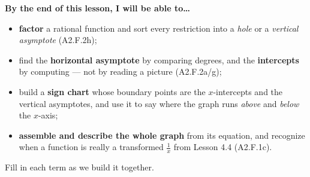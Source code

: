 \documentclass[10pt]{article}
\begin{document}
\namedateperiod

\vspace{0.08in}

\begin{objectivebox}
\textbf{By the end of this lesson, I will be able to\dots}
\begin{itemize}\setlength{\itemsep}{2pt}
  \item \textbf{factor} a rational function and sort every restriction into a \emph{hole} or a \emph{vertical asymptote} (A2.F.2h);
  \item find the \textbf{horizontal asymptote} by comparing degrees, and the \textbf{intercepts} by computing --- not by reading a picture (A2.F.2a/g);
  \item build a \textbf{sign chart} whose boundary points are the $x$-intercepts and the vertical asymptotes, and use it to say where the graph runs \emph{above} and \emph{below} the $x$-axis;
  \item \textbf{assemble and describe the whole graph} from its equation, and recognize when a function is really a transformed $\frac1x$ from Lesson 4.4 (A2.F.1c).
\end{itemize}
\end{objectivebox}

\vspace{0.05in}

\begin{vocabbox}
\small
Fill in each term as we build it together.
\par\vspace{2pt}   %
\end{vocabbox}
\end{document}
